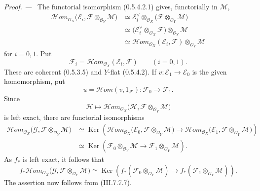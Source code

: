\documentclass[10pt,oneside]{book}
\newcommand{\sh}[1]{\mathscr{#1}}
\newcommand{\Ker}{\operatorname{Ker}}
\newcommand{\shHom}{\mathscr{H}\!om}
\newcommand{\sref}[2][]{(#2)}
\newenvironment{proof}{\par\medskip\noindent\textit{Proof. ---\ }}{\par}
\begin{document}
\begin{proof}
The functorial isomorphism \sref[0]{0.5.4.2.1} gives,
functorially in $\sh{M}$,
\begin{align*}
  \shHom_{\sh{O}_X}
    \bigl(\sh{E}_i,
      \sh{F}\otimes_{\sh{O}_Y}\sh{M}\bigr)
  &\simeq
  \sh{E}_i^\vee
    \otimes_{\sh{O}_X}
    \bigl(\sh{F}\otimes_{\sh{O}_Y}\sh{M}\bigr)\\
  &\simeq
  \bigl(
    \sh{E}_i^\vee\otimes_{\sh{O}_X}\sh{F}
  \bigr)
  \otimes_{\sh{O}_Y}\sh{M}\\
  &\simeq
  \shHom_{\sh{O}_X}(\sh{E}_i,\sh{F})
  \otimes_{\sh{O}_Y}\sh{M}
\end{align*}
for $i=0,1$.  Put
\[
  \sh{F}_i
  =
  \shHom_{\sh{O}_X}(\sh{E}_i,\sh{F})
  \qquad(i=0,1).
\]
These are coherent \sref[0]{0.5.3.5} and $Y$-flat
\sref[0]{0.5.4.2}.  If
$v:\sh{E}_1\to\sh{E}_0$ is the given homomorphism, put
\[
  u=\shHom(v,1_{\sh{F}}):\sh{F}_0\longrightarrow\sh{F}_1.
\]
Since
\[
  \sh{H}\longmapsto
  \shHom_{\sh{O}_X}
  \bigl(\sh{H},
    \sh{F}\otimes_{\sh{O}_Y}\sh{M}\bigr)
\]
is left exact, there are functorial isomorphisms
\begin{align*}
  \shHom_{\sh{O}_X}
  \bigl(\sh{G},
    \sh{F}\otimes_{\sh{O}_Y}\sh{M}\bigr)
  &\simeq
  \Ker\left(
    \shHom_{\sh{O}_X}
      \bigl(\sh{E}_0,
        \sh{F}\otimes_{\sh{O}_Y}\sh{M}\bigr)
    \longrightarrow
    \shHom_{\sh{O}_X}
      \bigl(\sh{E}_1,
        \sh{F}\otimes_{\sh{O}_Y}\sh{M}\bigr)
  \right)\\
  &\simeq
  \Ker\left(
    \sh{F}_0\otimes_{\sh{O}_Y}\sh{M}
    \longrightarrow
    \sh{F}_1\otimes_{\sh{O}_Y}\sh{M}
  \right).
\end{align*}
As $f_*$ is left exact, it follows that
\[
  f_*\shHom_{\sh{O}_X}
  \bigl(\sh{G},
    \sh{F}\otimes_{\sh{O}_Y}\sh{M}\bigr)
  \simeq
  \Ker\left(
    f_*(\sh{F}_0\otimes_{\sh{O}_Y}\sh{M})
    \longrightarrow
    f_*(\sh{F}_1\otimes_{\sh{O}_Y}\sh{M})
  \right).
\]
The assertion now follows from \sref{III.7.7.7}.
\end{proof}
\end{document}
